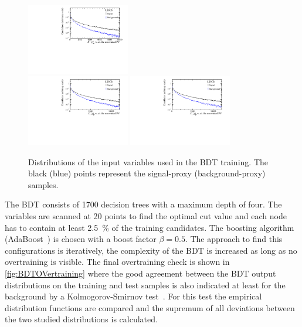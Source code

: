 \begin{figure}[tbp]
\begin{center}
		\includegraphics[width=0.40\textwidth]{07selection/figs/BDTInputs/ab3_IPCHI2_OWNPV.pdf}\\
		\includegraphics[width=0.40\textwidth]{07selection/figs/BDTInputs/ab4_IPCHI2_OWNPV.pdf}
		\includegraphics[width=0.40\textwidth]{07selection/figs/BDTInputs/ab5_IPCHI2_OWNPV.pdf}
	\end{center}
	\caption{Distributions of the input variables used in the BDT training.
	The black (blue) points represent the signal-proxy (background-proxy) samples.}
	\label{fig:BDTInput2}
\end{figure}
The \ac{BDT} consists of \num{1700} decision trees with a maximum depth of four.
The variables are scanned at \num{20} points to find the optimal cut value and each node has to contain at least \SI{2.5}{\percent} of the training candidates.
The boosting algorithm (AdaBoost~\cite{AdaBoost}) is chosen with a boost factor $\beta=0.5$.
The approach to find this configurations is iteratively, \ie the complexity of the \ac{BDT} is increased as long as no overtraining is visible.
The final overtraining check is shown in \cref{fig:BDTOVertraining} where the good agreement between the \ac{BDT} output distributions on the training and test samples is also indicated at least for the background by a Kolmogorov-Smirnov test~\cite{Bohm:389738}.
For this test the empirical distribution functions are compared and the supremum of all deviations between the two studied distributions is calculated.
